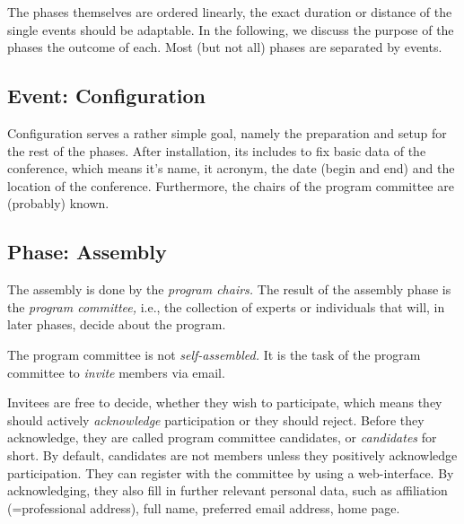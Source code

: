 The phases themselves are ordered linearly, the exact duration or distance
of the single events should be adaptable. In the following, we discuss the
purpose of the phases the outcome of each. Most (but not all) phases are
separated by events.


\medskip



\iffalse
\paragraph{A word of warning} 
The following phases reflect an idealized situation, where all phases are
cleanly separated, all actors in the game do the correct things etc.
Sometimes this will not be the case. Clearly, a user must be able to
correct information he provided; one instance is described in
Section~\ref{sec:submission}, where a submission is replaced by a newer
one. 
\fi










\subsection{Event: Configuration}
\label{sec:configuration}

Configuration serves a rather simple goal, namely the preparation and setup
for the rest of the phases. After installation, its includes to fix basic
data of the conference, which means it's name, it acronym, the date (begin
and end) and the location of the conference. Furthermore, the chairs of the
program committee are (probably) known.






\subsection{Phase: Assembly}
\label{sec:assembly}

The assembly is done by the \emph{program chairs.} The result of the
assembly phase is the \emph{program committee,} i.e., the collection of
experts or individuals that will, in later phases, decide about the
program.

The program committee is not \emph{self-assembled.} It is the task of the
program committee to \emph{invite} members via email.

Invitees are free to decide, whether they wish to participate, which means
they should actively \emph{acknowledge} participation or they should
reject. Before they acknowledge, they are called program committee
candidates, or \emph{candidates} for short. By default, candidates are not
members unless they positively acknowledge participation.  They can
register with the committee by using a web-interface. By acknowledging,
they also fill in further relevant personal data, such as affiliation
(=professional address), full name, preferred email address, home page.



